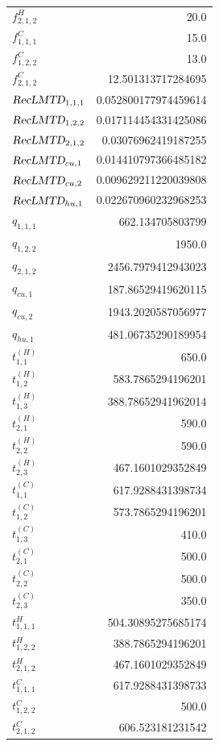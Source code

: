 \documentclass{article}%
\begin{document}
\begin{multicols*}{3}
\begin{supertabular}{lr}
	$f_{2,1,2}^{H}$ & 20.0 \\%
	$f_{1,1,1}^{C}$ & 15.0 \\%
	$f_{1,2,2}^{C}$ & 13.0 \\%
	$f_{2,1,2}^{C}$ & 12.501313717284695 \\%
	$\textsl{RecLMTD}_{1,1,1}$ & 0.052800177974459614 \\%
	$\textsl{RecLMTD}_{1,2,2}$ & 0.017114454331425086 \\%
	$\textsl{RecLMTD}_{2,1,2}$ & 0.03076962419187255 \\%
	$\textsl{RecLMTD}_{cu,1}$ & 0.014410797366485182 \\%
	$\textsl{RecLMTD}_{cu,2}$ & 0.009629211220039808 \\%
	$\textsl{RecLMTD}_{hu,1}$ & 0.022670960232968253 \\%
	$q_{1,1,1}$ & 662.134705803799 \\%
	$q_{1,2,2}$ & 1950.0 \\%
	$q_{2,1,2}$ & 2456.7979412943023 \\%
	$q_{cu,1}$ & 187.86529419620115 \\%
	$q_{cu,2}$ & 1943.2020587056977 \\%
	$q_{hu,1}$ & 481.06735290189954 \\%
	$t_{1,1}^{(H)}$ & 650.0 \\%
	$t_{1,2}^{(H)}$ & 583.7865294196201 \\%
	$t_{1,3}^{(H)}$ & 388.78652941962014 \\%
	$t_{2,1}^{(H)}$ & 590.0 \\%
	$t_{2,2}^{(H)}$ & 590.0 \\%
	$t_{2,3}^{(H)}$ & 467.1601029352849 \\%
	$t_{1,1}^{(C)}$ & 617.9288431398734 \\%
	$t_{1,2}^{(C)}$ & 573.7865294196201 \\%
	$t_{1,3}^{(C)}$ & 410.0 \\%
	$t_{2,1}^{(C)}$ & 500.0 \\%
	$t_{2,2}^{(C)}$ & 500.0 \\%
	$t_{2,3}^{(C)}$ & 350.0 \\%
	$t_{1,1,1}^{H}$ & 504.30895275685174 \\%
	$t_{1,2,2}^{H}$ & 388.7865294196201 \\%
	$t_{2,1,2}^{H}$ & 467.1601029352849 \\%
	$t_{1,1,1}^{C}$ & 617.9288431398733 \\%
	$t_{1,2,2}^{C}$ & 500.0 \\%
	$t_{2,1,2}^{C}$ & 606.523181231542 \\%

\end{supertabular}
\end{multicols*}
\end{document}
